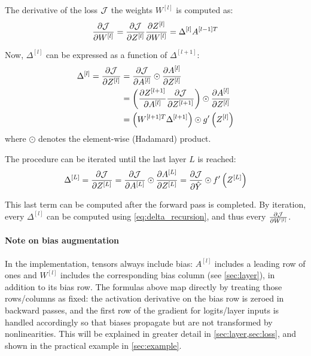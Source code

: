 The derivative of the loss $\mathcal{J}$ \wrt the weights $W^{[l]}$ is computed as:
\begin{equation} \label{eq:weight_grad}
    \pdv{\mathcal{J}}{W^{[l]}} = \pdv{\mathcal{J}}{Z^{[l]}} \pdv{Z^{[l]}}{W^{[l]}} = \Delta^{[l]} A^{[l-1]T}
\end{equation}

Now, $\Delta^{[l]}$ can be expressed as a function of $\Delta^{[l + 1]}$:
\begin{equation} \label{eq:delta_recursion}
\begin{split}
    \Delta^{[l]} = \pdv{\mathcal{J}}{Z^{[l]}} &= \pdv{\mathcal{J}}{A^{[l]}} \odot \pdv{A^{[l]}}{Z^{[l]}}\\
    &= \left(\pdv{Z^{[l+1]}}{A^{[l]}} \pdv{\mathcal{J}}{Z^{[l+1]}} \right) \odot \pdv{A^{[l]}}{Z^{[l]}}\\
    &= \left(W^{[l+1]T} \Delta^{[l+1]} \right) \odot g'\left(Z^{[l]}\right)
\end{split}
\end{equation}
where $\odot$ denotes the element-wise (Hadamard) product.

The procedure can be iterated until the last layer $L$ is reached:
\begin{equation*}
    \Delta^{[L]} = \pdv{\mathcal{J}}{Z^{[L]}} = \pdv{\mathcal{J}}{A^{[L]}} \odot \pdv{A^{[L]}}{Z^{[L]}} = \pdv{\mathcal{J}}{\hat{Y}} \odot f'\left(Z^{[L]}\right)
\end{equation*}

This last term can be computed after the forward pass is completed. By iteration, every $\Delta^{[l]}$ can be computed using \cref{eq:delta_recursion}, and thus every $\pdv{\mathcal{J}}{W^{[l]}}$.

\paragraph{Note on bias augmentation} In the implementation, tensors always include bias: $A^{[l]}$ includes a leading row of ones and $W^{[l]}$ includes the corresponding bias column (see \cref{sec:layer}), in addition to its bias row. The formulas above map directly by treating those rows/columns as fixed: the activation derivative on the bias row is zeroed in backward passes, and the first row of the gradient for logits/layer inputs is handled accordingly so that biases propagate but are not transformed by nonlinearities. This will be explained in greater detail in \cref{sec:layer,sec:loss}, and shown in the practical example in \cref{sec:example}.
